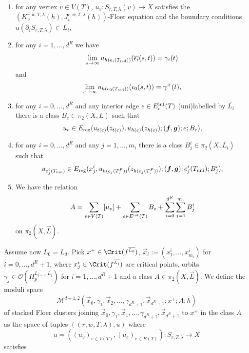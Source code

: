 	\begin{enumerate}
		\item for any vertex $v\in V(T)$, $u_v\colon S_{r,T,\lambda}(v)\to X$ satisfies the $(K^{r,w,T,\lambda}_v(h),J^{r,w,T,\lambda}_v(h))$-Floer equation and the boundary conditions $u(\partial_iS_{r,T,\lambda})\subset \overline{L_i}$,
		\item for any $i=1,\ldots,d^R$ we have $$\lim_{s\to \-\infty}u_{h(e_i(T_\textnormal{red}))}(\overline{\epsilon_i}(s,t))=\gamma_i(t)$$ and $$\lim_{s\to \infty}u_{h(e_0(T_\textnormal{red}))}(\epsilon_0(s,t))=\gamma^+(t),$$
		\item for any $i=0,\ldots,d^R$ and any interior edge $e\in E_i^\textnormal{int}(T)$ (uni)labelled by $\overline{L_i}$ there is a class $B_e\in \pi_2(X,L)$ such that $$u_e\in E_\textnormal{reg}(u_{t(e)}(z_{t(e)}), u_{h(e)}(z_{h(e)});(\boldsymbol{f},\boldsymbol{g});e;B_e),$$
		\item for any $i=0,\ldots,d^R$ and any $j=1,\ldots,m_i$ there is a class $B_j^i\in \pi_2(X,\overline{L_i})$ such that $$u_{e^i_j(T_\textnormal{uni})}\in E_\textnormal{reg}(x^i_{j}, u_{h(e_j(T_i^F))}(z_{h(e_j(T_i^F))});(\boldsymbol{f},\boldsymbol{g});e^i_j(T_\textnormal{uni});B_j^i),$$
		\item We have the relation $$A=\sum_{v\in V(T)}[u_v]+\sum_{e\in E^\textnormal{int}(T)}B_e+\sum_{i=0}^{d^R}\sum_{j=1}^{m_i}B_j^i$$ on $\pi_2(X,\vec{L})$.
	\end{enumerate}
	
	Assume now $L_0=L_d$. Pick $x^+\in \Crit(f^{\overline{L_0}})$, $\vec{x}_i:=(x_1^i,\ldots,x_{\overline{m_i}}^i)$ for $i=0,\ldots,d^R+1$, where $x^i_j\in \Crit(f^{\overline{L_i}})$ are critical points, orbits $\gamma_j\in \mathcal{O}(H^{\overline{L_{j-1}},\overline{L_j}}_p)$ for $i=1,\ldots,d^R+1$ and a class $A\in \pi_2(X,\vec{L})$. We define the moduli space $$\mathcal{M}^{d+1,2}\left(\vec{x}_0, \gamma_1, \vec{x}_2,\ldots,\gamma_{d^R+1}, \vec{x}_{d^R+1}; x^+;A;h\right)$$ of stacked Floer clusters joining $\vec{x}_0, \gamma_1, \vec{x}_1,\ldots,\gamma_{d^R+1}, \vec{x}_{d^R+1}$ to $x^+$ in the class $A$ as the space of tuples $((r,w,T,\lambda),u)$ where $$u=((u_v)_{v\in V(T)}, (u_e)_{e\in E(T)})\colon S_{r,T,\lambda}\to X$$ satisfies
	
